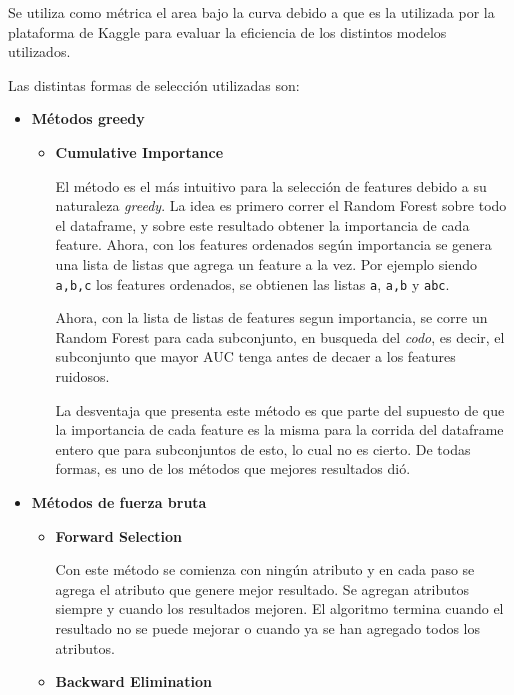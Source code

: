 \documentclass[a4paper]{article}
\begin{document}
Se utiliza como métrica el area bajo la curva debido a que es la utilizada por la plataforma de Kaggle para evaluar la eficiencia de los distintos modelos utilizados. 

Las distintas formas de selección utilizadas son:

\begin {itemize}

\item \textbf{Métodos greedy}

\begin {itemize}

	\item \textbf{Cumulative Importance}

	El método es el más intuitivo para la selección de features debido a su naturaleza \textit{greedy}. La idea es primero correr el Random Forest sobre todo el dataframe, y sobre este resultado obtener la importancia de cada feature. Ahora, con los features ordenados según importancia se genera una lista de listas que agrega un feature a la vez. Por ejemplo siendo \texttt{a,b,c} los features ordenados, se obtienen las listas \texttt{a}, \texttt{a,b} y  \texttt{abc}.

	Ahora, con la lista de listas de features segun importancia, se corre un Random Forest para cada subconjunto, en busqueda del \textit{codo}, es decir, el subconjunto que mayor AUC tenga antes de decaer a los features ruidosos.

	La desventaja que presenta este método es que parte del supuesto de que la importancia de cada feature es la misma para la corrida del dataframe entero que para subconjuntos de esto, lo cual no es cierto. De todas formas, es uno de los métodos que mejores resultados dió.

\end{itemize}

\item \textbf{Métodos de fuerza bruta}

\begin{itemize}

	\item \textbf{Forward Selection}

	Con este método se comienza con ningún atributo y en cada paso se agrega el atributo que genere mejor resultado. Se agregan atributos siempre y cuando los resultados mejoren. El algoritmo termina cuando el resultado no se puede mejorar o cuando ya se han agregado todos los atributos.

	\item \textbf{Backward Elimination}


\end{itemize}
\end{itemize}
\end{document}
